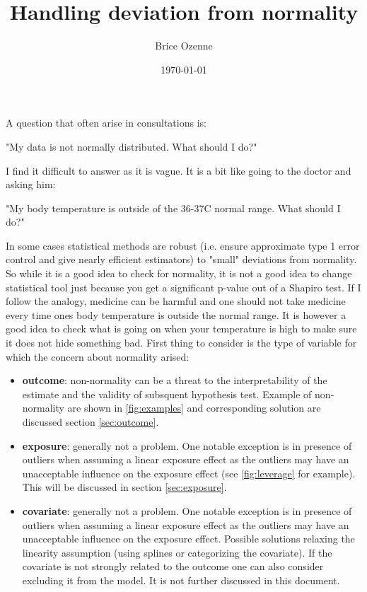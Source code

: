 \documentclass[12pt]{article}
\author{Brice Ozenne}
\date{\today}
\title{Handling deviation from normality}
\begin{document}
\maketitle
\noindent A question that often arise in consultations is:

\begin{center}
"My data is not normally distributed. What should I do?"
\end{center}

\noindent I find it difficult to answer as it is vague. It is a bit
like going to the doctor and asking him:

\begin{center}
 "My body temperature is outside of
the 36-37\textdegree C normal range. What should I do?"
\end{center}

\noindent In some cases statistical methods are robust (i.e. ensure
approximate type 1 error control and give nearly efficient estimators)
to "small" deviations from normality. So while it is a good idea to
check for normality, it is not a good idea to change statistical tool
just because you get a significant p-value out of a Shapiro test. If I
follow the analogy, medicine can be harmful and one should not take
medicine every time ones body temperature is outside the normal
range. It is however a good idea to check what is going on when your
temperature is high to make sure it does not hide something bad. First
thing to consider is the type of variable for which the concern about
normality arised:
\begin{itemize}
\item \textbf{outcome}: non-normality can be a threat to the interpretability
of the estimate and the validity of subsquent hypothesis
test. Example of non-normality are shown in \autoref{fig:examples}
and corresponding solution are discussed section \ref{sec:outcome}.
\item \textbf{exposure}: generally not a problem. One notable exception is in
presence of outliers when assuming a linear exposure effect as the
outliers may have an unacceptable influence on the exposure effect
(see \autoref{fig:leverage} for example). This will be discussed in
section \ref{sec:exposure}.
\item \textbf{covariate}: generally not a problem. One notable exception is in
presence of outliers when assuming a linear exposure effect as the
outliers may have an unacceptable influence on the exposure
effect. Possible solutions relaxing the linearity assumption
(using splines or categorizing the covariate). If the covariate is
not strongly related to the outcome one can also consider
excluding it from the model. It is not further discussed in this
document.
\end{itemize}
\end{document}
